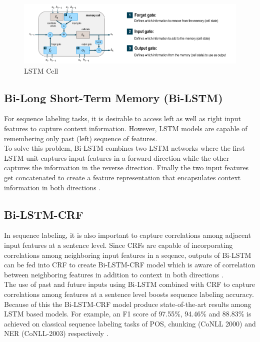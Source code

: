\begin{figure}[htbp]
	\centering
	\includegraphics[width=1\textwidth]{4.graphics/figures/ch_5/pdf/LSTM_cell2}
	\caption{\ac{LSTM} Cell \citep{fischer2018deep}}
	\label{fig:chapter03:setup}
\end{figure}


\subsection{Bi-Long Short-Term Memory (\ac{Bi-LSTM})}
\label{sec:chapter05:DLModels:BiLSTM}

For sequence labeling tasks, it is desirable to access left as well as right input features to capture context information. However, LSTM models are capable of remembering only past (left) sequence of features.  \\

To solve this problem, Bi-LSTM combines two LSTM networks where the first LSTM unit captures  input features in a forward direction while the other captures the information in the reverse direction. Finally the two input features get concatenated to create a feature representation that encapsulates context information in both directions \citep{ma2016end}. 


\subsection{\ac{Bi-LSTM-CRF}}
\label{sec:chapter05:DLModels:BiLSTMCRF}

In sequence labeling, it is also important to capture correlations among adjacent input features at a sentence level. Since CRFs are capable of incorporating correlations among neighboring input features in a seqence, outputs of Bi-LSTM can be fed into CRF to create Bi-LSTM-CRF model which is aware of correlation between neighboring features in addition to context in both directions \citep{ma2016end}. \\

The use of past and future inputs using Bi-LSTM combined with CRF to capture correlations among features at a sentence level boosts sequence labeling accuracy. Because of this the Bi-LSTM-CRF model produce state-of-the-art results among LSTM based models. For example, an F1 score of 97.55\%, 94.46\% and 88.83\% is achieved on classical sequence labeling tasks of POS, chunking (CoNLL 2000) and NER (CoNLL-2003) respectively \citep{huang2015bidirectional}. 
 

